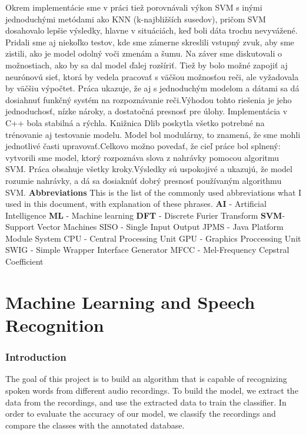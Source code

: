 \documentclass[english,12pt,oneside,a4paper]{article}
\begin{document}
	Okrem implementácie sme v práci tiež porovnávali výkon SVM s inými jednoduchými metódami ako KNN (k-najbližších susedov), pričom SVM dosahovalo lepšie výsledky, hlavne v situáciách, keď boli dáta trochu nevyvážené. Pridali sme aj niekoľko testov, kde sme zámerne skreslili vstupný zvuk, aby sme zistili, ako je model odolný voči zmenám a šumu. Na záver sme diskutovali o možnostiach, ako by sa dal model ďalej rozšíriť. Tiež by bolo možné zapojiť aj neurónovú sieť, ktorá by vedela pracovať s väčšou možnosťou reči, ale vyžadovala by väčšiu výpočtet. Práca ukazuje, že aj s jednoduchým modelom a dátami sa dá dosiahnuť funkčný systém na rozpoznávanie reči.Výhodou tohto riešenia je jeho jednoduchosť, nízke nároky, a dostatočná presnosť pre úlohy.
	Implementácia v C++ bola stabilná a rýchla. Knižnica Dlib poskytla všetko potrebné na trénovanie aj testovanie modelu. Model bol modulárny, to znamená, že sme mohli jednotlivé časti upravovať.Celkovo možno povedať, že cieľ práce bol splnený: vytvorili sme model, ktorý rozpoznáva slova z nahrávky pomocou algoritmu SVM. Práca obsahuje všetky kroky.Výsledky sú uspokojivé a ukazujú, že model rozumie nahrávky, a dá sa dosiaknúť dobrý presnosť používaným algorithmu SVM.
	\newpage
	\newpage
	\tableofcontents
	\newpage
	\textbf{Abbreviations}
	\newline
	\newline
	This is the list of the commonly used abbreviations what I used in this document, with explanation of these phrases.
	\newline
	\textbf{AI} - Artificial Intelligence
	\newline
	\textbf{ML} - Machine learning
	\newline
	\textbf{DFT} - Discrete Furier Transform
	\newline
	\textbf{SVM}- Support Vector Machines
	\newline
	SISO - Single Input Output
	\newline
	JPMS - Java Platform Module System
	\newline
	CPU - Central Processing Unit 
	GPU - Graphics Proccessing Unit
	SWIG - Simple Wrapper Interface Generator
	MFCC - Mel-Frequency Cepstral Coefficient
	\newpage
	\part{Machine Learning and Speech Recognition}
		\section{Introduction}
		The goal of this project is to build an algorithm that is capable of recognizing spoken words from different audio recordings. To build the model, we extract the data from the recordings, and use the extracted data to train the classifier. In order to evaluate the  accuracy of our model, we classify the recordings and compare the classes with the annotated database.
\end{document}
